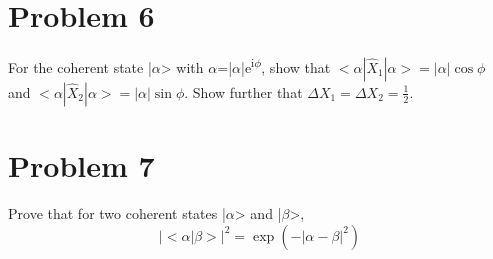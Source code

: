 \documentclass[a4paper,11pt]{article}
\begin{document}
\section*{Problem 6}
\label{sec:orgda3dc16}
For the coherent state |\(\alpha\)> with \(\alpha\)=|\(\alpha\)|e\textsuperscript{i\(\phi\)}, show that \(<\alpha|\hat{X}_1|\alpha>=|\alpha|\cos\phi\) and \(<\alpha|\hat{X}_2|\alpha>=|\alpha|\sin\phi\). Show further that \(\Delta X_1 = \Delta X_2 = \frac{1}{2}\).

\section*{Problem 7}
\label{sec:orgab3a86f}
Prove that for two coherent states |\(\alpha\)> and |\(\beta\)>,
$$|<\alpha|\beta>|^2=\exp(-|\alpha-\beta|^2)$$
\end{document}
